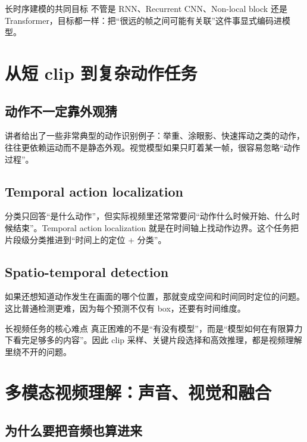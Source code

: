 \documentclass[a4paper]{article}
\begin{document}
\begin{importantbox}{长时序建模的共同目标}
不管是 RNN、Recurrent CNN、Non-local block 还是 Transformer，目标都一样：把“很远的帧之间可能有关联”这件事显式编码进模型。
\end{importantbox}

\section{从短 clip 到复杂动作任务}

\subsection{动作不一定靠外观猜}

讲者给出了一些非常典型的动作识别例子：举重、涂眼影、快速挥动之类的动作，往往更依赖运动而不是静态外观。视觉模型如果只盯着某一帧，很容易忽略“动作过程”。

\subsection{Temporal action localization}

分类只回答“是什么动作”，但实际视频里还常常要问“动作什么时候开始、什么时候结束”。Temporal action localization 就是在时间轴上找动作边界。这个任务把片段级分类推进到“时间上的定位 + 分类”。

\subsection{Spatio-temporal detection}

如果还想知道动作发生在画面的哪个位置，那就变成空间和时间同时定位的问题。这比普通检测更难，因为每个预测不仅有 box，还要有时间维度。

\begin{warningbox}{长视频任务的核心难点}
真正困难的不是“有没有模型”，而是“模型如何在有限算力下看完足够多的内容”。因此 clip 采样、关键片段选择和高效推理，都是视频理解里绕不开的问题。
\end{warningbox}

\section{多模态视频理解：声音、视觉和融合}

\subsection{为什么要把音频也算进来}
\end{document}
